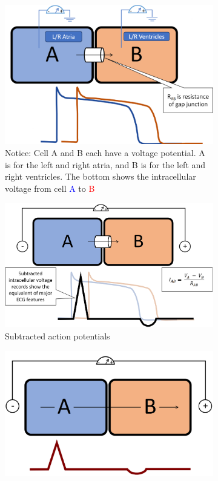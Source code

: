 \documentclass[11pt,fleqn]{book} %
\begin{document}
\begin{figure}[h!]
    \centering
    \begin{subfigure}{0.45\textwidth}
        \includegraphics[width=\textwidth]{Pictures/Screenshot 2024-04-03 234113.png}
        \caption{Notice: Cell A and B
each have a voltage
potential. A is for the left and right atria, and B is for the left and right ventricles. The bottom shows the intracellular voltage from cell \textcolor{blue}{A} to \textcolor{red}{B}}
    \end{subfigure}
    \hfill
    \begin{subfigure}{0.45\textwidth}
        \includegraphics[width=\textwidth]{Pictures/Screenshot 2024-04-03 234130.png}
        \caption{Subtracted action potentials}
    \end{subfigure}
    \begin{subfigure}{0.45\textwidth}
        \includegraphics[width=\textwidth]{Pictures/Screenshot 2024-04-03 234139.png}

\end{subfigure}
\end{figure}
\end{document}
